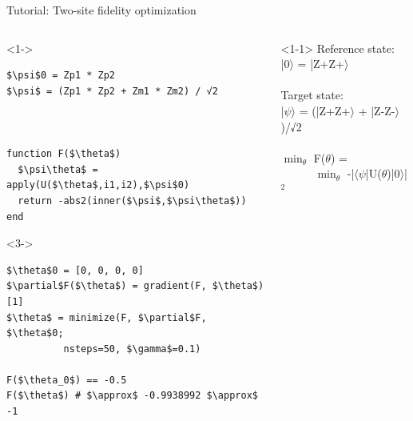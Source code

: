 \begin{frame}[fragile]{Tutorial: Two-site fidelity optimization}

\begin{columns}

\begin{column}{5cm}

\begin{onlyenv}<1->
\begin{lstlisting}[language=JuliaLocal, style=julia, mathescape, basicstyle=\scriptsize\ttfamily]
$\psi$0 = Zp1 * Zp2
$\psi$ = (Zp1 * Zp2 + Zm1 * Zm2) / √2



function F($\theta$)
  $\psi\theta$ = apply(U($\theta$,i1,i2),$\psi$0)
  return -abs2(inner($\psi$,$\psi\theta$))
end
\end{lstlisting}
\end{onlyenv}

\begin{onlyenv}<3->
\begin{lstlisting}[language=JuliaLocal, style=julia, mathescape, basicstyle=\scriptsize\ttfamily]
$\theta$0 = [0, 0, 0, 0]
$\partial$F($\theta$) = gradient(F, $\theta$)[1]
$\theta$ = minimize(F, $\partial$F, $\theta$0;
          nsteps=50, $\gamma$=0.1)

F($\theta_0$) == -0.5
F($\theta$) # $\approx$ -0.9938992 $\approx$ -1
\end{lstlisting}
\end{onlyenv}

\end{column}

\begin{column}{5cm}

\begin{onlyenv}<1-1>
Reference state: \\
|0$\rangle$ = |Z+Z+$\rangle$ \\
~\\
Target state: \\
|$\psi\rangle$ = (|Z+Z+$\rangle$ + |Z-Z-$\rangle$)/√2 \\
~\\
$\min_{\theta}$ F($\theta$) = \\
\ \ \ \ \ \ $\min_{\theta}$ -|$\langle\psi$|U($\theta$)|0$\rangle$|$^2$
\end{onlyenv}


\end{column}
\end{columns}
\end{frame}
